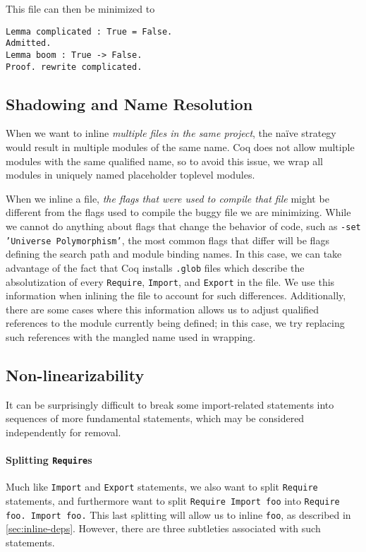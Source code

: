 \documentclass[a4paper,USenglish,cleveref,autoref,thm-restate]{lipics-v2021}
\begin{document}
This file can then be minimized to
\begin{verbatim}
Lemma complicated : True = False.
Admitted.
Lemma boom : True -> False.
Proof. rewrite complicated.
\end{verbatim}

\subsection{Shadowing and Name Resolution}

When we want to inline \emph{multiple files in the same project}, the na\"ive strategy would result in multiple modules of the same name.
Coq does not allow multiple modules with the same qualified name, so to avoid this issue, we wrap all modules in uniquely named placeholder toplevel modules.

When we inline a file, \emph{the flags that were used to compile that file} might be different from the flags used to compile the buggy file we are minimizing.
While we cannot do anything about flags that change the behavior of code, such as \texttt{-set 'Universe Polymorphism'}, the most common flags that differ will be flags defining the search path and module binding names.
In this case, we can take advantage of the fact that Coq installs \texttt{.glob} files which describe the absolutization of every \texttt{Require}, \texttt{Import}, and \texttt{Export} in the file.
We use this information when inlining the file to account for such differences.
Additionally, there are some cases where this information allows us to adjust qualified references to the module currently being defined; in this case, we try replacing such references with the mangled name used in wrapping.

\subsection{Non-linearizability}

It can be surprisingly difficult to break some import-related statements into sequences of more fundamental statements, which may be considered independently for removal.

\paragraph{Splitting \texttt{Require}s}
Much like \verb|Import| and \verb|Export| statements, we also want to split \verb|Require| statements, and furthermore want to split \verb|Require Import foo| into \texttt{Require foo. Import foo.}
This last splitting will allow us to inline \verb|foo|, as described in \autoref{sec:inline-deps}.
However, there are three subtleties associated with such statements.
\end{document}
